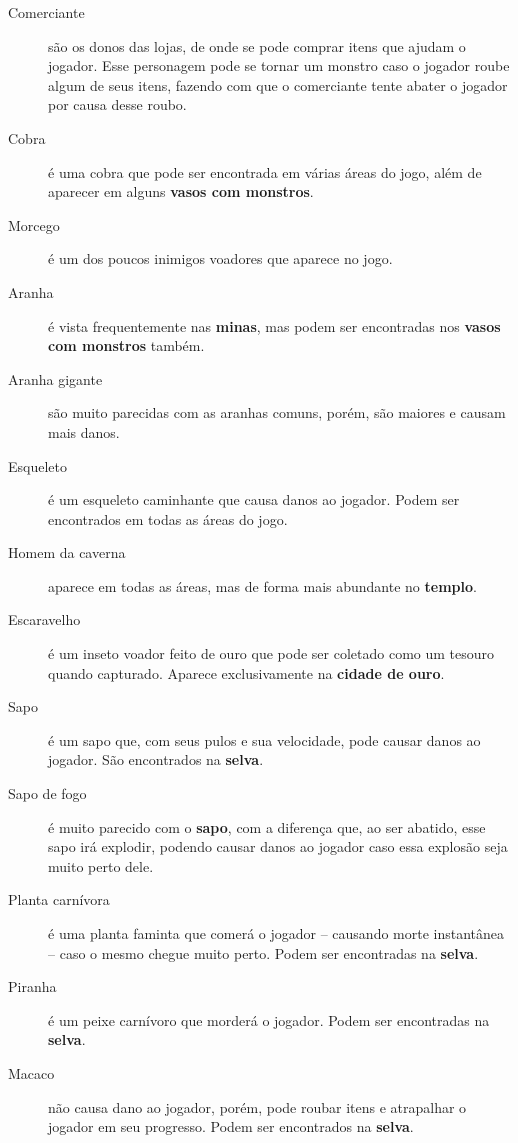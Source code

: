 \begin{description}
    \item[Comerciante]
        são os donos das lojas, de onde se pode comprar itens que ajudam o
        jogador. Esse personagem pode se tornar um monstro caso o jogador roube
        algum de seus itens, fazendo com que o comerciante tente abater o
        jogador por causa desse roubo.
    \item[Cobra]
        é uma cobra que pode ser encontrada em várias áreas do jogo, além de
        aparecer em alguns \textbf{vasos com monstros}.
    \item[Morcego]
        é um dos poucos inimigos voadores que aparece no jogo.
    \item[Aranha]
        é vista frequentemente nas \textbf{minas}, mas podem ser encontradas
        nos \textbf{vasos com monstros} também.
    \item[Aranha gigante]
        são muito parecidas com as aranhas comuns, porém, são maiores e causam
        mais danos.
    \item[Esqueleto]
        é um esqueleto caminhante que causa danos ao jogador. Podem ser
        encontrados em todas as áreas do jogo.
    \item[Homem da caverna]
        aparece em todas as áreas, mas de forma mais abundante no \textbf{templo}.
    \item[Escaravelho]
        é um inseto voador feito de ouro que pode ser coletado como um tesouro
        quando capturado. Aparece exclusivamente na \textbf{cidade de ouro}.
    \item[Sapo]
        é um sapo que, com seus pulos e sua velocidade, pode causar danos ao
        jogador. São encontrados na \textbf{selva}.
    \item[Sapo de fogo]
        é muito parecido com o \textbf{sapo}, com a diferença que, ao ser
        abatido, esse sapo irá explodir, podendo causar danos ao jogador caso
        essa explosão seja muito perto dele.
    \item[Planta carnívora]
        é uma planta faminta que comerá o jogador -- causando morte instantânea
        -- caso o mesmo chegue muito perto. Podem ser encontradas na
        \textbf{selva}.
    \item[Piranha]
        é um peixe carnívoro que morderá o jogador. Podem ser encontradas na
        \textbf{selva}.
    \item[Macaco]
        não causa dano ao jogador, porém, pode roubar itens e atrapalhar o
        jogador em seu progresso. Podem ser encontrados na \textbf{selva}.

\end{description}
